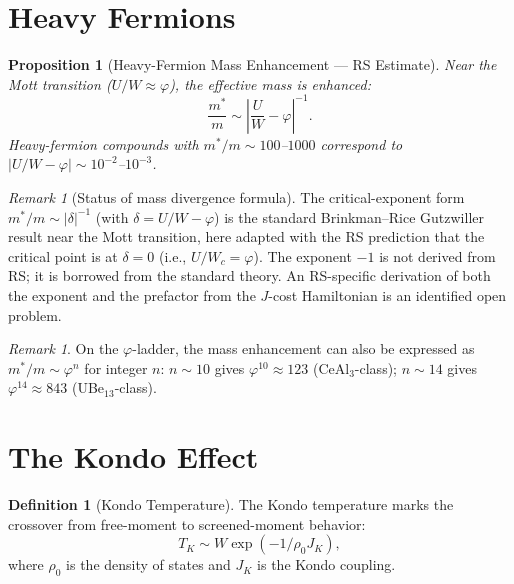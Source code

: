 \documentclass[12pt,a4paper]{article}
\newtheorem{proposition}[theorem]{Proposition}
\theoremstyle{definition}
\newtheorem{definition}[theorem]{Definition}
\theoremstyle{remark}
\newtheorem{remark}[theorem]{Remark}
\begin{document}
\section{Heavy Fermions}
\label{sec:heavy}

\begin{proposition}[Heavy-Fermion Mass Enhancement --- RS Estimate]
\label{thm:heavy}
Near the Mott transition ($U/W \approx \varphi$), the effective
mass is enhanced:
\begin{equation}
  \frac{m^*}{m} \sim \left|\frac{U}{W} - \varphi\right|^{-1}.
\end{equation}
Heavy-fermion compounds with $m^*/m \sim 100$--$1000$ correspond
to $|U/W - \varphi| \sim 10^{-2}$--$10^{-3}$.
\end{proposition}

\begin{remark}[Status of mass divergence formula]
The critical-exponent form $m^*/m \sim |\delta|^{-1}$ (with
$\delta = U/W - \varphi$) is the standard Brinkman--Rice
Gutzwiller result near the Mott transition, here adapted with
the RS prediction that the critical point is at $\delta = 0$
(i.e., $U/W_c = \varphi$).  The exponent $-1$ is not derived
from RS; it is borrowed from the standard theory.  An RS-specific
derivation of both the exponent and the prefactor from the
$J$-cost Hamiltonian is an identified open problem.
\end{remark}

\begin{remark}
On the $\varphi$-ladder, the mass enhancement can also be
expressed as $m^*/m \sim \varphi^n$ for integer $n$:
$n \sim 10$ gives $\varphi^{10} \approx 123$ (CeAl$_3$-class);
$n \sim 14$ gives $\varphi^{14} \approx 843$ (UBe$_{13}$-class).
\end{remark}

\section{The Kondo Effect}
\label{sec:kondo}

\begin{definition}[Kondo Temperature]
The Kondo temperature marks the crossover from free-moment to
screened-moment behavior:
\begin{equation}
  T_K \sim W \exp(-1/\rho_0 J_K),
\end{equation}
where $\rho_0$ is the density of states and $J_K$ is the Kondo
coupling.
\end{definition}
\end{document}
